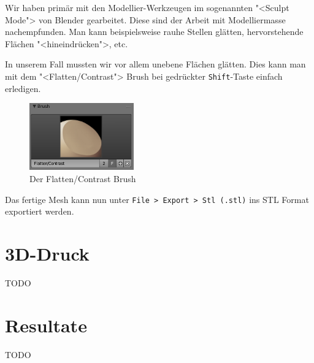 Wir haben primär mit den Modellier-Werkzeugen im sogenannten "<Sculpt Mode"> von
Blender gearbeitet. Diese sind der Arbeit mit Modelliermasse nachempfunden. Man
kann beispielsweise rauhe Stellen glätten, hervorstehende Flächen
"<hineindrücken">, etc. 

In unserem Fall mussten wir vor allem unebene Flächen glätten. Dies kann man mit
dem "<Flatten/Contrast"> Brush bei gedrückter \texttt{Shift}-Taste einfach
erledigen.

\begin{figure}[H]
	\centering
	\includegraphics[width=0.4\textwidth]{images/blender_flatten_brush.png}
	\caption{Der Flatten/Contrast Brush}
	\label{img:blender_brush}
\end{figure}

Das fertige Mesh kann nun unter \texttt{File > Export > Stl (.stl)} ins STL
Format exportiert werden.


\section{3D-Druck}

TODO


\section{Resultate}

TODO
